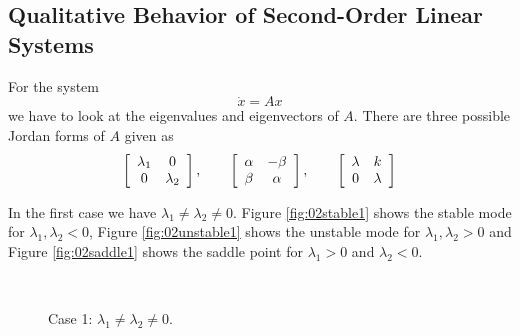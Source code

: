 \subsection{Qualitative Behavior of Second-Order Linear Systems}
For the system
$$\dot{x} = Ax$$
we have to look at the eigenvalues and eigenvectors of $A$. There are three possible Jordan forms of $A$ given as
\begin{align*}
\left[\begin{array}{c c} \lambda_1 & 0 \\ 0 & \lambda_2 \end{array}\right], \qquad
\left[\begin{array}{c c} \alpha & -\beta \\ \beta & \alpha \end{array}\right], \qquad
\left[\begin{array}{c c} \lambda & k \\ 0 & \lambda \end{array}\right]
\end{align*}

In the first case we have $\lambda_1\neq\lambda_2\neq0$. Figure \ref{fig:02stable1} shows the stable mode for $\lambda_1, \lambda_2<0$, Figure \ref{fig:02unstable1} shows the unstable mode for $\lambda_1, \lambda_2>0$ and Figure \ref{fig:02saddle1} shows the saddle point for $\lambda_1>0$ and $\lambda_2<0$.

\begin{figure}[ht!]
  \centering
   \hfill
   \\
  \caption{Case 1: $\lambda_1\neq\lambda_2\neq0$.}
  \label{fig:02case1}
\end{figure}

